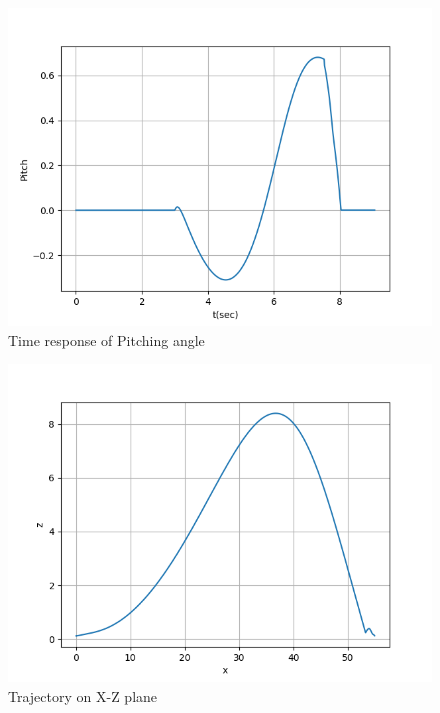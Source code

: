 \documentclass{beamer}
\begin{document}
    \begin{frame}{\secname}
        \begin{figure}
            \includegraphics[width=.5\linewidth]{Figs/Pitch.png}
            \caption{Time response of Pitching angle}
        \end{figure}
    \end{frame}

    \begin{frame}{\secname}
        \begin{figure}
            \includegraphics[width=.5\linewidth]{Figs/xz_plane.png}
            \caption{Trajectory on X-Z plane}
        \end{figure}
    \end{frame}
\end{document}
